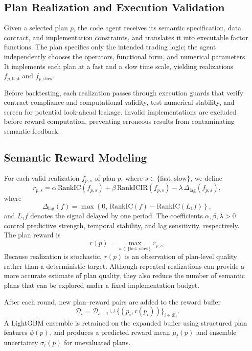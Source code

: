 \subsection{Plan Realization and Execution Validation}

Given a selected plan \(p\), the code agent receives its semantic
specification, data contract, and implementation constraints, and
translates it into executable factor functions. The plan specifies only
the intended trading logic; the agent independently chooses the
operators, functional form, and numerical parameters. It implements each
plan at a fast and a slow time scale, yielding realizations
\(f_{p,\mathrm{fast}}\) and \(f_{p,\mathrm{slow}}\).

Before backtesting, each realization passes through execution guards
that verify contract compliance and computational validity, test
numerical stability, and screen for potential look-ahead leakage.
Invalid implementations are excluded before reward computation,
preventing erroneous results from contaminating semantic feedback.

\subsection{Semantic Reward Modeling}

For each valid realization \(f_{p,s}\) of plan \(p\), where
\(s\in\{\mathrm{fast},\mathrm{slow}\}\), we define
\begin{equation}
r_{p,s}
=
\alpha\,\mathrm{RankIC}(f_{p,s})
+\beta\,\mathrm{RankICIR}(f_{p,s})
-\lambda\,\Delta_{\mathrm{lag}}(f_{p,s}),
\end{equation}
where
\[
\Delta_{\mathrm{lag}}(f)
=
\max\!\left\{
0,\,
\mathrm{RankIC}(f)-\mathrm{RankIC}(L_1f)
\right\},
\]
and \(L_1f\) denotes the signal delayed by one period. The coefficients
\(\alpha,\beta,\lambda>0\) control predictive strength, temporal
stability, and lag sensitivity, respectively. The plan reward is
\[
r(p)=\max_{s\in\{\mathrm{fast},\mathrm{slow}\}}r_{p,s}.
\]
Because realization is stochastic, \(r(p)\) is an observation of
plan-level quality rather than a deterministic target. Although repeated realizations can provide a more accurate estimate of plan quality, they also reduce the number of semantic plans that can be explored under a fixed implementation budget.

After each round, new plan--reward pairs are added to the reward buffer
\[
\mathcal{D}_t
=
\mathcal{D}_{t-1}
\cup
\{(p_i,r(p_i))\}_{i\in\mathcal{B}_t}.
\]
A LightGBM ensemble is retrained on the expanded buffer using structured
plan features \(\phi(p)\), and produces a predicted reward mean
\(\mu_t(p)\) and ensemble uncertainty \(\sigma_t(p)\) for unevaluated
plans.

